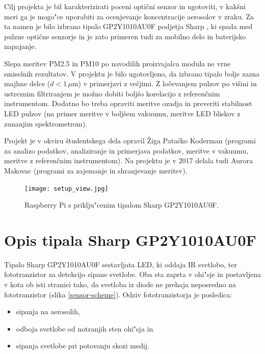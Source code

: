 \documentclass[12pt,a4paper]{article}
\begin{document}
Cilj projekta je bil karakterizirati poceni optični senzor in ugotoviti, v kakšni meri ga je mogo"ce uporabiti za ocenjevanje koncentracije aerosolov v zraku. Za ta namen je bilo izbrano tipalo GP2Y1010AU0F podjetja Sharp \cite{sharp-gp2y1010au0f},
ki spada med pulzne optične senzorje in je zato primeren tudi za mobilno delo in baterijsko napajanje. 


 Slepa meritev PM2.5 in PM10 po navodilih proizvajalca modula ne vrne smiselnih rezultatov.
V projektu je bilo ugotovljeno, da izbrano tipalo bolje zazna majhne delce ($d < 1\,\mu$m) v primerjavi z večjimi. Z ločevanjem pulzov po višini in ustreznim filtriranjem je možno dobiti boljšo korelacijo z referenčnim instrumentom. Dodatno bo treba opraviti meritve ozadja in preveriti stabilnost LED pulzov (na primer meritve v boljšem vakuumu, meritve LED bliskov z zunanjim spektrometrom). 

\bigskip
Projekt je v okviru študentskega dela opravil Žiga Patačko Koderman (programi za analizo podatkov, analiziranje in primerjava podatkov, meritve v vakuumu, meritve z referenčnim instrumentom). 
Na projektu je v 2017 delala tudi Aurora Makovac (programi za zajemanje in shranjevanje meritev).

\begin{figure}[bh!]
	\begin{center}
		\texttt{[image: setup\_view.jpg]}
		\caption{Raspberry Pi s priklju"cenim tipalom Sharp GP2Y1010AU0F.}
		\label{setup-view}
	\end{center}
\end{figure}

\newpage
\section{Opis tipala Sharp GP2Y1010AU0F}

Tipalo Sharp GP2Y1010AU0F \cite{sharp-gp2y1010au0f} sestavljata LED, ki oddaja IR svetlobo, ter fototranzistor za detekcijo sipane svetlobe. Oba sta zaprta v ohi"sje in postavljena v kota ob isti stranici tako, da svetloba iz diode ne prehaja neposredno na fototranzistor (slika \ref{sensor-scheme}). Odziv fototranzistorja je posledica:
\begin{itemize}
	\item sipanja na aerosolih,
	\item odboja svetlobe od notranjih sten ohi"sja in
	\item sipanja svetlobe pri potovanju skozi medij.
\end{itemize}
\end{document}
